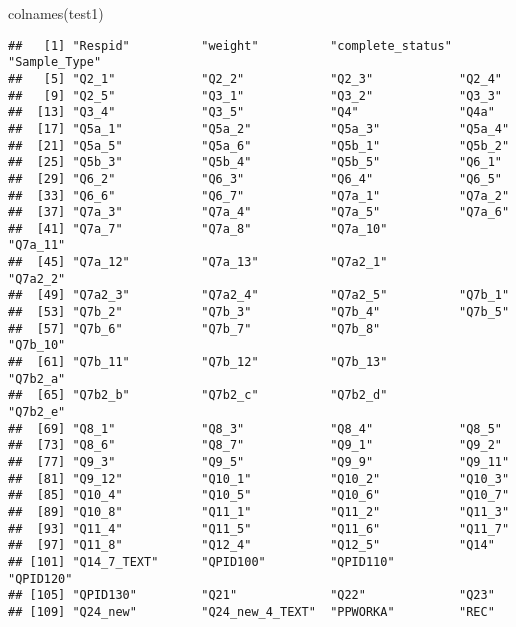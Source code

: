 \documentclass[
]{article}
\newenvironment{Shaded}{\begin{snugshade}}{\end{snugshade}}
\newcommand{\FunctionTok}[1]{\textcolor[rgb]{0.00,0.00,0.00}{#1}}
\newcommand{\NormalTok}[1]{#1}
\begin{document}
\begin{Shaded}
\begin{Highlighting}[]
\FunctionTok{colnames}\NormalTok{(test1)}
\end{Highlighting}
\end{Shaded}

\begin{verbatim}
##   [1] "Respid"          "weight"          "complete_status" "Sample_Type"    
##   [5] "Q2_1"            "Q2_2"            "Q2_3"            "Q2_4"           
##   [9] "Q2_5"            "Q3_1"            "Q3_2"            "Q3_3"           
##  [13] "Q3_4"            "Q3_5"            "Q4"              "Q4a"            
##  [17] "Q5a_1"           "Q5a_2"           "Q5a_3"           "Q5a_4"          
##  [21] "Q5a_5"           "Q5a_6"           "Q5b_1"           "Q5b_2"          
##  [25] "Q5b_3"           "Q5b_4"           "Q5b_5"           "Q6_1"           
##  [29] "Q6_2"            "Q6_3"            "Q6_4"            "Q6_5"           
##  [33] "Q6_6"            "Q6_7"            "Q7a_1"           "Q7a_2"          
##  [37] "Q7a_3"           "Q7a_4"           "Q7a_5"           "Q7a_6"          
##  [41] "Q7a_7"           "Q7a_8"           "Q7a_10"          "Q7a_11"         
##  [45] "Q7a_12"          "Q7a_13"          "Q7a2_1"          "Q7a2_2"         
##  [49] "Q7a2_3"          "Q7a2_4"          "Q7a2_5"          "Q7b_1"          
##  [53] "Q7b_2"           "Q7b_3"           "Q7b_4"           "Q7b_5"          
##  [57] "Q7b_6"           "Q7b_7"           "Q7b_8"           "Q7b_10"         
##  [61] "Q7b_11"          "Q7b_12"          "Q7b_13"          "Q7b2_a"         
##  [65] "Q7b2_b"          "Q7b2_c"          "Q7b2_d"          "Q7b2_e"         
##  [69] "Q8_1"            "Q8_3"            "Q8_4"            "Q8_5"           
##  [73] "Q8_6"            "Q8_7"            "Q9_1"            "Q9_2"           
##  [77] "Q9_3"            "Q9_5"            "Q9_9"            "Q9_11"          
##  [81] "Q9_12"           "Q10_1"           "Q10_2"           "Q10_3"          
##  [85] "Q10_4"           "Q10_5"           "Q10_6"           "Q10_7"          
##  [89] "Q10_8"           "Q11_1"           "Q11_2"           "Q11_3"          
##  [93] "Q11_4"           "Q11_5"           "Q11_6"           "Q11_7"          
##  [97] "Q11_8"           "Q12_4"           "Q12_5"           "Q14"            
## [101] "Q14_7_TEXT"      "QPID100"         "QPID110"         "QPID120"        
## [105] "QPID130"         "Q21"             "Q22"             "Q23"            
## [109] "Q24_new"         "Q24_new_4_TEXT"  "PPWORKA"         "REC"            

\end{verbatim}
\end{document}
